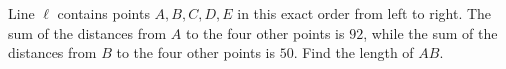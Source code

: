 Line $\ell$ contains points $A, B, C, D, E$ in this exact order from left to right. The sum of the distances from $A$ to the four other points is $92$, while the sum of the distances from $B$ to the four other points is $50$. Find the length of $AB$.
